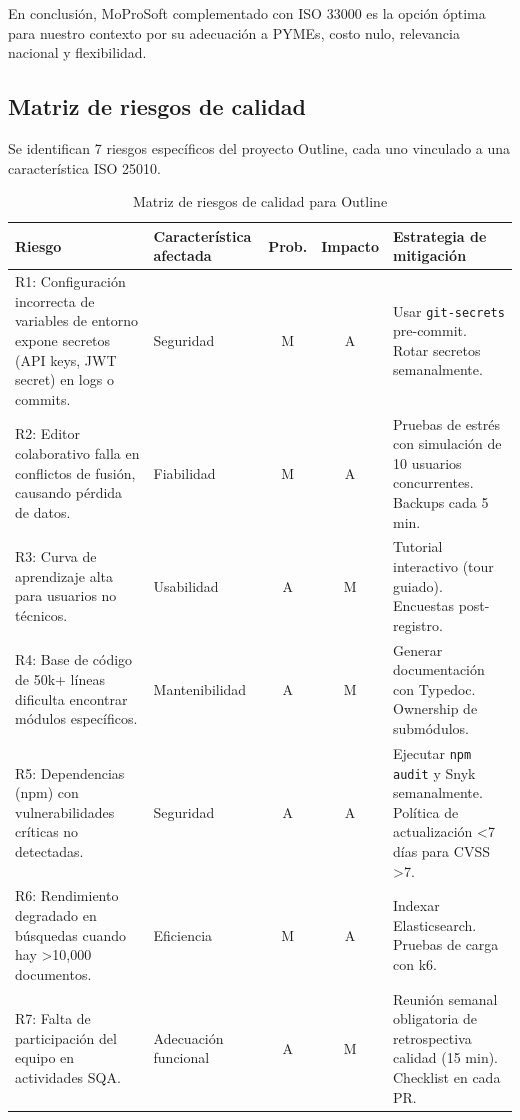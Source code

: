 \documentclass[12pt]{article}
\begin{document}
En conclusión, MoProSoft complementado con ISO 33000 es la opción óptima para nuestro contexto por su adecuación a PYMEs, costo nulo, relevancia nacional y flexibilidad.

\subsection{Matriz de riesgos de calidad}

Se identifican 7 riesgos específicos del proyecto Outline, cada uno vinculado a una característica ISO 25010.

\begin{table}[H]
\centering
\footnotesize
\renewcommand{\arraystretch}{1.3}
\begin{tabularx}{\textwidth}{|l|X|c|c|X|}
\hline
\textbf{Riesgo} & \textbf{Característica afectada} & \textbf{Prob.} & \textbf{Impacto} & \textbf{Estrategia de mitigación} \\
\hline
R1: Configuración incorrecta de variables de entorno expone secretos (API keys, JWT secret) en logs o commits. & Seguridad & \cellcolor{medium}M & \cellcolor{high}A & Usar \texttt{git-secrets} pre-commit. Rotar secretos semanalmente. \\
\hline
R2: Editor colaborativo falla en conflictos de fusión, causando pérdida de datos. & Fiabilidad & \cellcolor{medium}M & \cellcolor{high}A & Pruebas de estrés con simulación de 10 usuarios concurrentes. Backups cada 5 min. \\
\hline
R3: Curva de aprendizaje alta para usuarios no técnicos. & Usabilidad & \cellcolor{high}A & \cellcolor{medium}M & Tutorial interactivo (tour guiado). Encuestas post-registro. \\
\hline
R4: Base de código de 50k+ líneas dificulta encontrar módulos específicos. & Mantenibilidad & \cellcolor{high}A & \cellcolor{medium}M & Generar documentación con Typedoc. Ownership de submódulos. \\
\hline
R5: Dependencias (npm) con vulnerabilidades críticas no detectadas. & Seguridad & \cellcolor{high}A & \cellcolor{high}A & Ejecutar \texttt{npm audit} y Snyk semanalmente. Política de actualización <7 días para CVSS >7. \\
\hline
R6: Rendimiento degradado en búsquedas cuando hay >10,000 documentos. & Eficiencia & \cellcolor{medium}M & \cellcolor{high}A & Indexar Elasticsearch. Pruebas de carga con k6. \\
\hline
R7: Falta de participación del equipo en actividades SQA. & Adecuación funcional & \cellcolor{high}A & \cellcolor{medium}M & Reunión semanal obligatoria de retrospectiva calidad (15 min). Checklist en cada PR. \\
\hline
\end{tabularx}
\caption{Matriz de riesgos de calidad para Outline}
\end{table}
\end{document}
